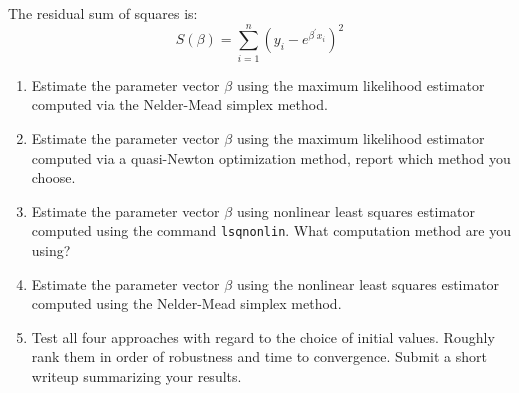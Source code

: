 \documentclass{article}
\begin{document}
The residual sum of squares is:%
\[
S\left( \beta \right) =\sum\limits_{i=1}^{n}\left( y_{i}-e^{\beta ^{\prime
}x_{i}}\right) ^{2} 
\]

\begin{enumerate}
\item Estimate the parameter vector $\beta$ using the maximum likelihood estimator computed via  
the Nelder-Mead simplex method. 

\item Estimate the parameter vector $\beta$ using the maximum likelihood estimator computed via  
a quasi-Newton optimization method, report which method you choose. 

\item Estimate the parameter vector $\beta$ using nonlinear least squares estimator computed using
the command {\tt lsqnonlin}. What computation method are you using? 

\item Estimate the parameter vector $\beta$ using the nonlinear least squares estimator computed using 
the Nelder-Mead simplex method. 

\item Test all four approaches with regard to the choice of initial values.  Roughly rank them in order of 
robustness and time to convergence. Submit a short writeup summarizing your results.  

\end{enumerate}
\end{document}
